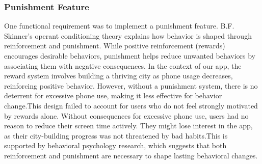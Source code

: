 \documentclass[sigconf, 11pt]{acmart}
\begin{document}
\subsubsection{Punishment Feature}
One functional requirement was to implement a punishment feature. B.F. Skinner's operant conditioning theory explains how behavior is shaped through reinforcement and punishment. While positive reinforcement (rewards) encourages desirable behaviors, punishment helps reduce unwanted behaviors by associating them with negative consequences. In the context of our app, the reward system involves building a thriving city as phone usage decreases, reinforcing positive behavior. However, without a punishment system, there is no deterrent for excessive phone use, making it less effective for behavior change.This design failed to account for users who do not feel strongly motivated by rewards alone. Without consequences for excessive phone use, users had no reason to reduce their screen time actively. They might lose interest in the app, as their city-building progress was not threatened by bad habits.This is supported by behavioral psychology research, which suggests that both reinforcement and punishment are necessary to shape lasting behavioral changes.
\\
\end{document}

